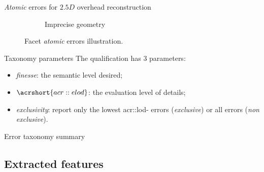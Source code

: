 \documentclass[export]{beamer}
\begin{document}
\begin{frame}[plain]{\emph{Atomic} errors for $2.5D$ overhead reconstruction}
{\begin{figure}
\begin{center}
\begin{subfigure}{.28\textwidth}
                                \caption{\label{fig::fac_height} Imprecise geometry}
                            \end{subfigure}
                            \caption{Facet \emph{atomic} errors illustration.}
                        \end{center}
                    \end{figure}
                }
            \end{frame}
            \begin{frame}{Taxonomy parameters}
                The qualification has $3$ parameters:
                \begin{itemize}[label=$\blacktriangleright$, font=\color{IGNGreen}]
                    \item<1-> \emph{finesse}: the semantic level desired;
                    \item<2-> $\acrshort{acr::elod}$: the evaluation level of details;
                    \item<3-> \emph{exclusivity}: report only the lowest \acrshort{acr::lod}- errors (\emph{exclusive}) or all errors (\emph{non exclusive}).
                \end{itemize}
            \end{frame}
            \begin{frame}{Error taxonomy summary}
                \begin{figure}
                    
                \end{figure}
            \end{frame}
        \subsection{Extracted features}
\end{document}
